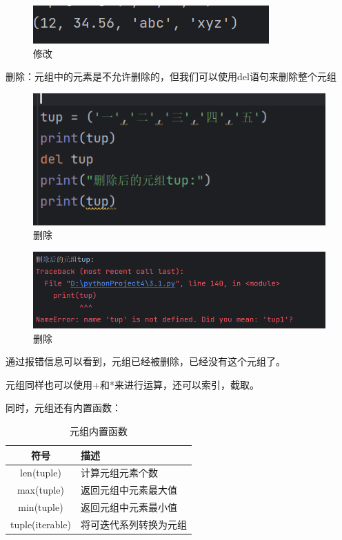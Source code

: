 \documentclass{ctexart}
\begin{document}
	\begin{figure}[H]
		\centering
		\includegraphics[scale=0.5]{3.37}
		\caption{修改}
	\end{figure}
	
	删除：元组中的元素是不允许删除的，但我们可以使用del语句来删除整个元组
	
	\begin{figure}[H]
		\centering
		\includegraphics[scale=0.5]{3.38}
		\caption{删除}
	\end{figure}
	
	\begin{figure}[H]
		\centering
		\includegraphics[scale=0.5]{3.39}
		\caption{删除}
	\end{figure}
	
	通过报错信息可以看到，元组已经被删除，已经没有这个元组了。
	
	元组同样也可以使用+和*来进行运算，还可以索引，截取。
	
	同时，元组还有内置函数：
	
	\begin{table}[h]
		\centering
		\caption{元组内置函数}
		\begin{tabular}{|c|p{10cm}|}
			\hline
			符号 & 描述  \\
			\hline
			len(tuple) & 计算元组元素个数 \\
			\hline
			max(tuple) & 返回元组中元素最大值\\
			\hline
			min(tuple) &返回元组中元素最小值\\ 
			\hline
			tuple(iterable) & 将可迭代系列转换为元组\\
			\hline
		\end{tabular}
	\end{table}
	
\end{document}
